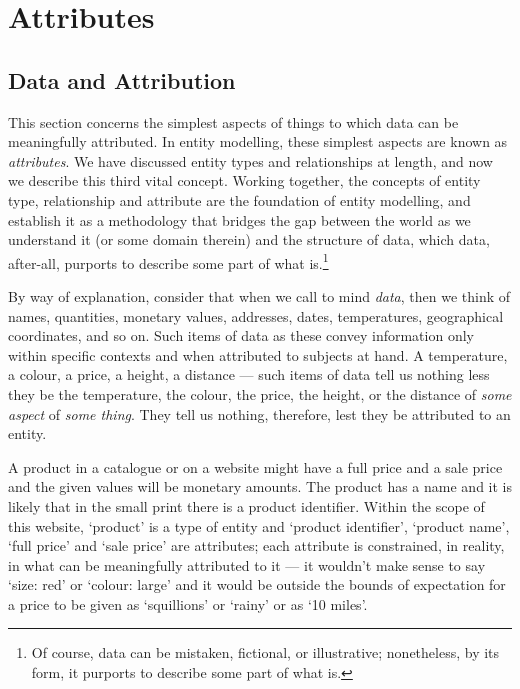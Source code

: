 

\section{Attributes}
\label{Attributes} 

\subsection{Data and Attribution}
\mynote
This section concerns the simplest aspects of things 
to which data can be meaningfully attributed. 
In entity modelling, these simplest aspects are known as \textit{attributes}.
We have discussed entity types and relationships at length, and now  we describe this  third vital concept.
Working together, the concepts of entity type, relationship and attribute
are the foundation of entity modelling, and establish it as a methodology that  bridges the gap between the world as we understand it (or some domain therein) and the structure of data, which data, after-all, purports to describe some part of what is.\footnote{Of course, data can be mistaken, fictional, or illustrative; nonetheless, by its form, it purports to describe some part of what is. } 

\mynote
By way of explanation, 
consider that when we call to mind \textit{data}, 
then we think of names, quantities, monetary values, 
addresses, dates, temperatures, geographical coordinates, and so on. 
Such items of data as these convey information only within specific contexts and when attributed 
to subjects at hand. 
A temperature, a colour, a price, a height, a distance — such items of data 
tell us nothing less they be the temperature, the colour, the price, the height, or the 
distance of \textit{some aspect} of \textit{some thing}. 
They tell us nothing, therefore, lest they be attributed to an entity.

\mynote
A product in a catalogue or on a website  might have a full price and a sale price
and the given values will be monetary amounts.
The product has a name 
and it is likely that in the small print there is a product identifier.
Within the scope of this website, `product' is a type of entity
and `product identifier', `product name',  `full price' and `sale price' are attributes;
each attribute is constrained, in reality, in what can be meaningfully attributed to it ---
it wouldn't make sense to say `size: red' or `colour: large' and
it  would be outside the bounds of expectation 
for a price to be given as `squillions' or `rainy' or as `10 miles'.

